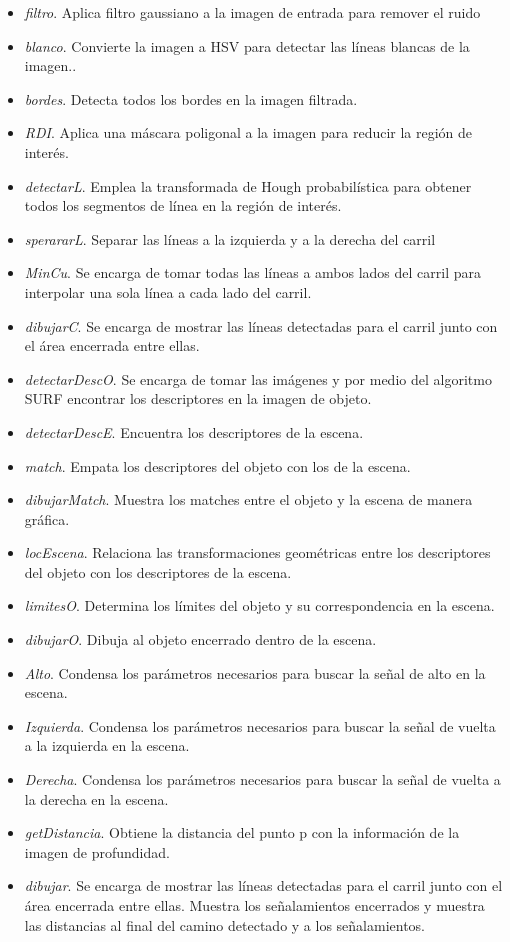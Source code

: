 \begin{itemize}
	\item {\it filtro}. Aplica filtro gaussiano a la imagen de entrada para remover el ruido 
	\item {\it blanco}. Convierte la imagen a HSV para detectar las líneas blancas de la imagen.. 
	\item {\it bordes}. Detecta todos los bordes en la imagen filtrada. 
	\item {\it RDI}. Aplica una máscara poligonal a la imagen para reducir la región de interés. 
	\item {\it detectarL}. Emplea la transformada de Hough probabilística para obtener todos los segmentos de línea en la región de interés.
	\item {\it sperararL}. Separar las líneas a la izquierda y a la derecha del carril 
	\item {\it MinCu}. Se encarga de tomar todas las líneas a ambos lados del carril para interpolar una sola línea a cada lado del carril. 
	\item {\it dibujarC}. Se encarga de mostrar las líneas detectadas para el carril junto con el área encerrada entre ellas. 
	\item {\it detectarDescO}. Se encarga de tomar las imágenes y por medio del algoritmo SURF encontrar los descriptores en la imagen de objeto. 
	\item {\it detectarDescE}. Encuentra los descriptores de la escena. 
	\item {\it match}. Empata los descriptores del objeto con los de la escena. 
	\item {\it dibujarMatch}. Muestra los matches entre el objeto y la escena de manera gráfica. 
	\item {\it locEscena}. Relaciona las transformaciones geométricas entre los descriptores del objeto con los descriptores de la escena. 
	\item {\it limitesO}. Determina los límites del objeto y su correspondencia en la escena. 
	\item {\it dibujarO}. Dibuja al objeto encerrado dentro de la escena. 
	\item {\it Alto}. Condensa los parámetros necesarios para buscar la señal de alto en la escena. 
	\item {\it Izquierda}. Condensa los parámetros necesarios para buscar la señal de vuelta a la izquierda en la escena. 
	\item {\it Derecha}. Condensa los parámetros necesarios para buscar la señal de vuelta a la derecha en la escena.
	\item {\it getDistancia}. Obtiene la distancia del punto p con la información de la imagen de profundidad.
	\item {\it dibujar}. Se encarga de mostrar las líneas detectadas para el carril junto con el área encerrada entre ellas. Muestra los señalamientos encerrados y muestra las distancias al final del camino detectado y a los señalamientos. 
\end{itemize}
